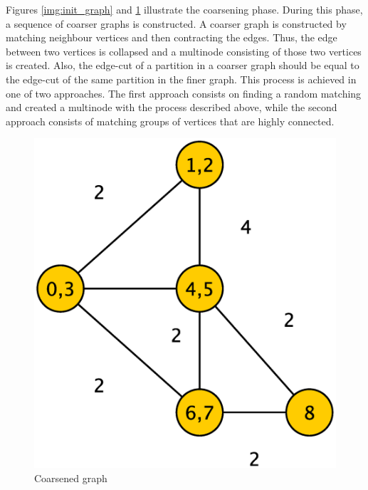\documentclass[abstract=on,9pt,twocolumn]{scrartcl}
\begin{document}
Figures \ref{img:init_graph} and \ref{img:coarse_graph} illustrate the coarsening phase. During this phase, a sequence of coarser graphs is constructed.\cite{Karypis95parallelmultilevel} A coarser graph is constructed by matching neighbour vertices and then contracting the edges. Thus, the edge between two vertices is collapsed and a multinode consisting of those two vertices is created. Also, the edge-cut of a partition in a coarser graph should be equal to the edge-cut of the same partition in the finer graph.\cite{Karypis:1998:FHQ:305219.305248} This process is achieved in one of two approaches. The first approach consists on finding a random matching and created a multinode with the process described above, while the second approach consists of matching groups of vertices that are highly connected.\cite{Karypis:1998:FHQ:305219.305248}

\begin{center}
  \begin{figure}[htb]
    \includegraphics[width=\columnwidth]{img/coarsening2.eps}
    \caption{Coarsened graph}
    \label{img:coarse_graph}
  \end{figure}
\end{center}
\end{document}
